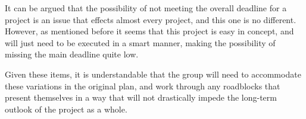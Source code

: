 \documentclass{article}
\begin{document}
    It can be argued that the possibility of not meeting the overall deadline for a project is an issue that effects almost every project, and this one is no different.
    However, as mentioned before it seems that this project is easy in concept, and will just need to be executed in a smart manner, making the possibility of missing the main deadline quite low.

    Given these items, it is understandable that the group will need to accommodate these variations in the original plan, and work through any roadblocks that present themselves in a way that will not drastically impede the long-term outlook of the project as a whole.
\end{document}
